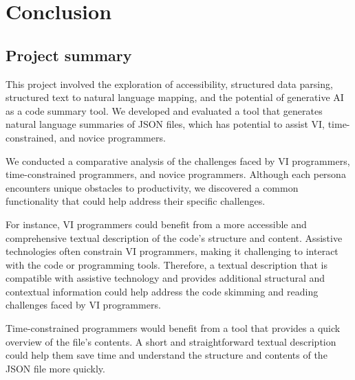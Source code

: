 \documentclass{l4proj}
\begin{document}
\chapter{Conclusion}  


\section{Project summary}

This project involved the exploration of accessibility, structured data parsing, structured text to natural language mapping, and the potential of generative AI as a code summary tool. We developed and evaluated a tool that generates natural language summaries of JSON files, which has potential to assist VI, time-constrained, and novice programmers. 

We conducted a comparative analysis of the challenges faced by VI programmers, time-constrained programmers, and novice programmers. Although each persona encounters unique obstacles to productivity, we discovered a common functionality that could help address their specific challenges.

For instance, VI programmers could benefit from a more accessible and comprehensive textual description of the code's structure and content. Assistive technologies often constrain VI programmers, making it challenging to interact with the code or programming tools. Therefore, a textual description that is compatible with assistive technology and provides additional structural and contextual information could help address the code skimming and reading challenges faced by VI programmers.

Time-constrained programmers would benefit from a tool that provides a quick overview of the file's contents. A short and straightforward textual description could help them save time and understand the structure and contents of the JSON file more quickly.
\end{document}
